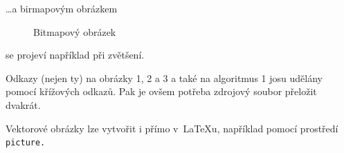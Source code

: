 \documentclass[a4paper,11pt]{article}
\begin{document}
\noindent\dots a birmapovým obrázkem

\begin{figure}[ht]
    \centering
    \caption{Bitmapový obrázek}
    \label{figure:oniisan2.eps}
\end{figure}
\noindent se projeví například při zvětšení.

Odkazy (nejen ty) na obrázky 1, 2 a 3 a také na algoritmus 1 josu udělány pomocí křížových odkazů. Pak je ovšem potřeba zdrojový soubor přeložit dvakrát.

Vektorové obrázky lze vytvořit i přímo v~\LaTeX u, například pomocí prostředí \verb|picture.|

\newpage
\end{document}

